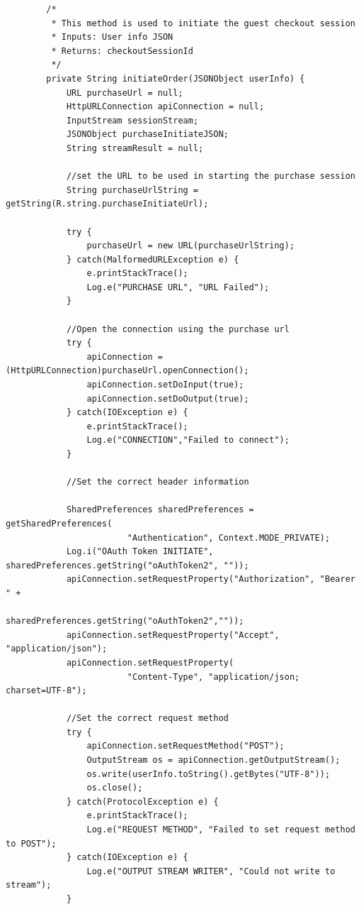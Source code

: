 \documentclass[journal,compsoc, 10pt, draftclsnofoot, onecolumn]{IEEEtran}
\begin{document}
\begin{lstlisting}
        /*
         * This method is used to initiate the guest checkout session
         * Inputs: User info JSON
         * Returns: checkoutSessionId
         */
        private String initiateOrder(JSONObject userInfo) {
            URL purchaseUrl = null;
            HttpURLConnection apiConnection = null;
            InputStream sessionStream;
            JSONObject purchaseInitiateJSON;
            String streamResult = null;

            //set the URL to be used in starting the purchase session
            String purchaseUrlString = getString(R.string.purchaseInitiateUrl);

            try {
                purchaseUrl = new URL(purchaseUrlString);
            } catch(MalformedURLException e) {
                e.printStackTrace();
                Log.e("PURCHASE URL", "URL Failed");
            }

            //Open the connection using the purchase url
            try {
                apiConnection = (HttpURLConnection)purchaseUrl.openConnection();
                apiConnection.setDoInput(true);
                apiConnection.setDoOutput(true);
            } catch(IOException e) {
                e.printStackTrace();
                Log.e("CONNECTION","Failed to connect");
            }

            //Set the correct header information

            SharedPreferences sharedPreferences = getSharedPreferences(
            			"Authentication", Context.MODE_PRIVATE);
            Log.i("OAuth Token INITIATE", sharedPreferences.getString("oAuthToken2", ""));
            apiConnection.setRequestProperty("Authorization", "Bearer " + 
            			sharedPreferences.getString("oAuthToken2",""));
            apiConnection.setRequestProperty("Accept", "application/json");
            apiConnection.setRequestProperty(
            			"Content-Type", "application/json; charset=UTF-8");

            //Set the correct request method
            try {
                apiConnection.setRequestMethod("POST");
                OutputStream os = apiConnection.getOutputStream();
                os.write(userInfo.toString().getBytes("UTF-8"));
                os.close();
            } catch(ProtocolException e) {
                e.printStackTrace();
                Log.e("REQUEST METHOD", "Failed to set request method to POST");
            } catch(IOException e) {
                Log.e("OUTPUT STREAM WRITER", "Could not write to stream");
            }


\end{lstlisting}
\end{document}
